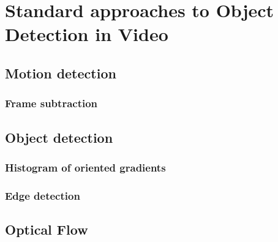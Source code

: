 \chapter{Standard approaches to Object Detection in Video}



\section{Motion detection}

\subsection{Frame subtraction}

\section{Object detection}

\subsection{Histogram of oriented gradients}

\subsection{Edge detection}
\section{Optical Flow}
